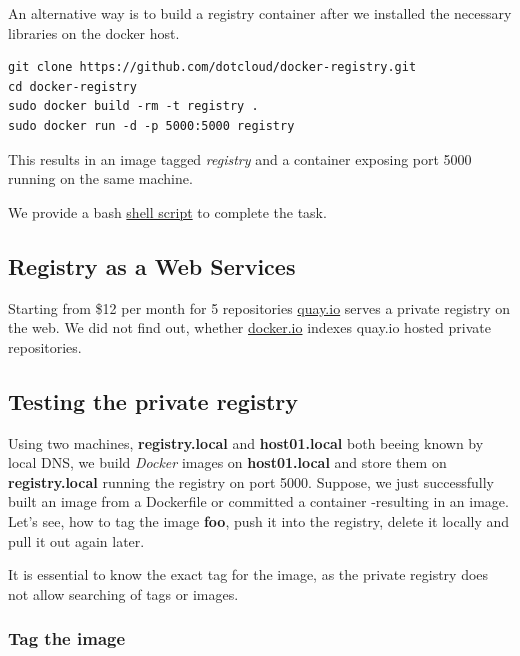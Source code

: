 \documentclass[captions=tableheading]{article}
\begin{document}
An alternative way is to build a registry container after we installed the necessary libraries on the docker host.

\begin{verbatim}
git clone https://github.com/dotcloud/docker-registry.git
cd docker-registry
sudo docker build -rm -t registry .
sudo docker run -d -p 5000:5000 registry
\end{verbatim}
This results in an image tagged \emph{registry} and a container exposing port 5000 running on the same machine.

We provide a bash \href{file:///debiandata/michael/elemica/docker/poc-docker-jenkins/container_builds/registry/buildRegistry.sh}{shell script}  to complete the task.
\subsection{Registry as a Web Services}
\label{sec-3-6}

Starting from \$12 per month for 5 repositories \href{https://quay.io/}{quay.io} serves a private registry on the web. We did not find out, whether \href{https://index.docker.io/}{docker.io} indexes quay.io hosted private repositories.
\subsection{Testing the private registry}
\label{sec-3-7}

Using two machines, \textbf{registry.local} and \textbf{host01.local} both beeing known by local DNS, we build \emph{Docker} images on \textbf{host01.local} and store them on \textbf{registry.local} running the registry on port 5000.  Suppose, we just successfully built an image from a Dockerfile or committed a container -resulting in an image. Let's see, how to tag the image \textbf{foo}, push it into the registry, delete it locally and pull it out again later. 

It is essential to know the exact tag for the image, as the private registry does not allow searching of tags or images. 
\subsubsection{Tag the image}
\label{sec-3-7-1}
\end{document}
